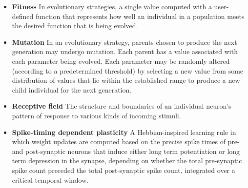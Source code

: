 \begin{itemize}
\item \textbf{Fitness} In evolutionary strategies, a single value computed with a user-defined function that represents how well an individual in a population meets the desired function that is being evolved.

\item \textbf{Mutation} In an evolutionary strategy, parents chosen to produce the next generation may undergo mutation. Each parent has a value associated with each parameter being evolved. Each parameter may be randomly altered (according to a predetermined threshold) by selecting a new value from some distribution of values that lie within the established range to produce a new child individual for the next generation.

\item \textbf{Receptive field} The structure and boundaries of an individual neuron's pattern of response to various kinds of incoming stimuli.

\item \textbf{Spike-timing dependent plasticity} A Hebbian-inspired learning rule in which weight updates are computed based on the precise spike times of pre- and post-synaptic neurons that induce either long term potentiation or long term depression in the synapse, depending on whether the total pre-synaptic spike count preceded the total post-synaptic spike count, integrated over a critical temporal window.

\end{itemize}